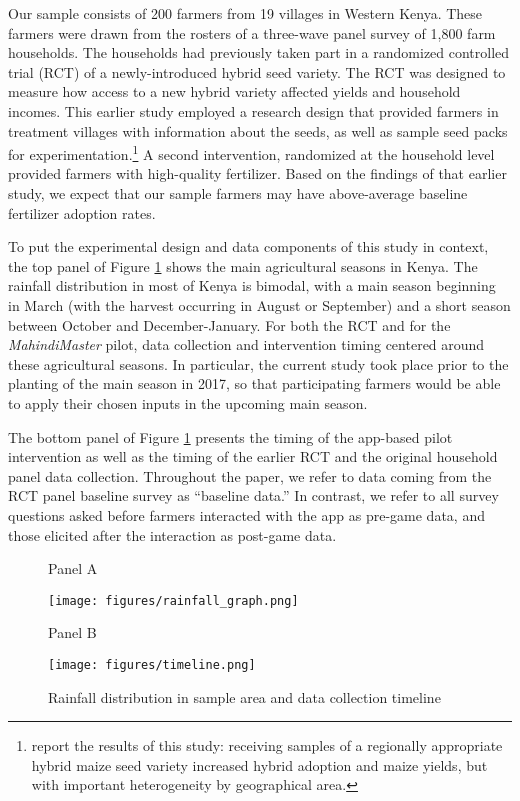 \documentclass[12pt,letterpaper]{article}
\begin{document}
Our sample consists of 200 farmers from 19 villages in Western Kenya. These farmers were drawn from the rosters of a three-wave panel survey of 1,800 farm households. The households had previously taken part in a randomized controlled trial (RCT) of a newly-introduced hybrid seed variety. The RCT was designed to measure how access to a new hybrid variety affected yields and household incomes. This earlier study employed a research design that provided farmers in treatment villages with information about the seeds, as well as sample seed packs for experimentation.\footnote{\cite{niche_carter_2019} report the results of this study: receiving samples of a regionally appropriate hybrid maize seed variety increased hybrid adoption and maize yields, but with important heterogeneity by geographical area.} A second intervention, randomized at the household level provided farmers with high-quality fertilizer. Based on the findings of that earlier study, we expect that our sample farmers may have above-average baseline fertilizer adoption rates.

To put the experimental design and data components of this study in context, the top panel of Figure \ref{fig:rainfall} shows the main agricultural seasons in Kenya. The rainfall distribution in most of Kenya is bimodal, with a main season beginning in March (with the harvest occurring in August or September) and a short season between October and December-January. For both the RCT and for the \textit{MahindiMaster} pilot, data collection and intervention timing centered around these agricultural seasons. In particular, the current study took place prior to the planting of the main season in 2017, so that  participating farmers would be able to apply their chosen inputs in the upcoming main season. 

The bottom panel of Figure \ref{fig:rainfall} presents the timing of the app-based pilot intervention as well as the timing of the earlier RCT and the original household panel data collection. Throughout the paper, we refer to data coming from the RCT panel baseline survey as ``baseline data.'' In contrast, we refer to all survey questions asked before farmers interacted with the app as pre-game data, and those elicited after the interaction as post-game data.

\begin{figure} 
\vspace{-1cm}
\centering Panel A 
\hspace*{-.3cm}\centerline{\texttt{[image: figures/rainfall\_graph.png]}} \par 
\centering Panel B
\centerline{\texttt{[image: figures/timeline.png]}}
\caption{Rainfall distribution in sample area and data collection timeline} \label{fig:rainfall}
\end{figure}
\end{document}
